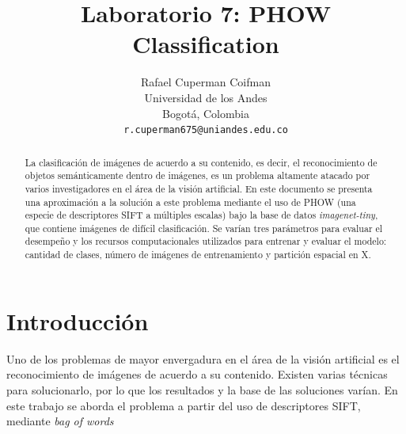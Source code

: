 \documentclass[10pt,twocolumn,letterpaper]{article}
\begin{document}
\title{Laboratorio 7: PHOW Classification}

\author{Rafael Cuperman Coifman\\
Universidad de los Andes\\
Bogotá, Colombia\\
{\tt\small r.cuperman675@uniandes.edu.co}
}

\maketitle

\begin{abstract}
La clasificación de imágenes de acuerdo a su contenido, es decir, el reconocimiento de objetos semánticamente dentro de imágenes, es un problema altamente atacado por varios investigadores en el área de la visión artificial. En este documento se presenta una aproximación a la solución a este problema mediante el uso de PHOW (una especie de descriptores SIFT a múltiples escalas) bajo la base de datos \textit{imagenet-tiny}, que contiene imágenes de difícil clasificación. Se varían tres parámetros para evaluar el desempeño y los recursos computacionales utilizados para entrenar y evaluar el modelo: cantidad de clases, número de imágenes de entrenamiento y partición espacial en X.
\end{abstract}

\section{Introducción}
Uno de los problemas de mayor envergadura en el área de la visión artificial es el reconocimiento de imágenes de acuerdo a su contenido. Existen varias técnicas para solucionarlo, por lo que los resultados y la base de las soluciones varían. En este trabajo se aborda el problema a partir del uso de descriptores SIFT, mediante \textit{bag of words}
\end{document}
